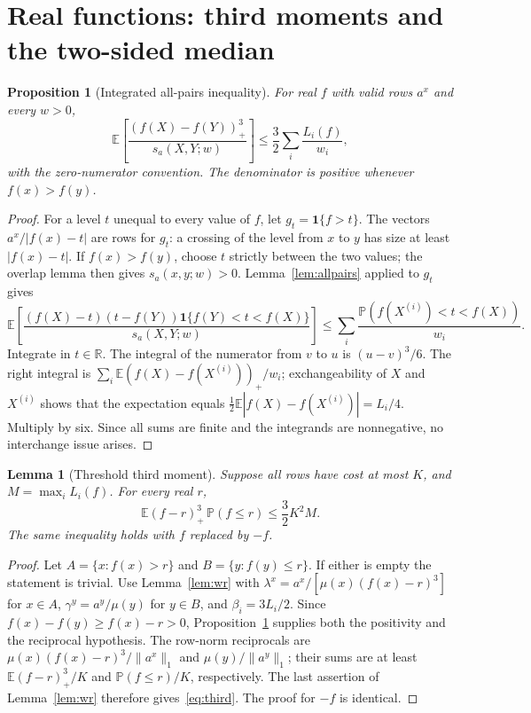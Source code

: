 \documentclass[11pt]{article}
\numberwithin{equation}{section}
\newtheorem{lemma}[theorem]{Lemma}
\newtheorem{proposition}[theorem]{Proposition}
\theoremstyle{remark}
\newcommand{\E}{\mathbb E}
\newcommand{\Prb}{\mathbb P}
\newcommand{\one}{\mathbf 1}
\newcommand{\R}{\mathbb R}
\newcommand{\norm}[1]{\lVert #1\rVert}
\newcommand{\pos}[1]{(#1)_{+}}
\begin{document}
\section{Real functions: third moments and the two-sided median}\label{sec:moments}
\begin{proposition}[Integrated all-pairs inequality]\label{prop:int}
For real $f$ with valid rows $a^x$ and every $w>0$,
\begin{equation}\label{eq:integrated}
 \E\left[\frac{\pos{f(X)-f(Y)}^3}{s_a(X,Y;w)}\right]
 \le\frac32\sum_i\frac{L_i(f)}{w_i},
\end{equation}
with the zero-numerator convention. The denominator is positive whenever $f(x)>f(y)$.
\end{proposition}
\begin{proof}
For a level $t$ unequal to every value of $f$, let $g_t=\one\{f>t\}$. The vectors $a^x/|f(x)-t|$ are rows for $g_t$: a crossing of the level from $x$ to $y$ has size at least $|f(x)-t|$. If $f(x)>f(y)$, choose $t$ strictly between the two values; the overlap lemma then gives $s_a(x,y;w)>0$. Lemma~\ref{lem:allpairs} applied to $g_t$ gives
\[
 \E\left[\frac{(f(X)-t)(t-f(Y))\one\{f(Y)<t<f(X)\}}
 {s_a(X,Y;w)}\right]
 \le\sum_i\frac{\Prb(f(X^{(i)})<t<f(X))}{w_i}.
\]
Integrate in $t\in\R$. The integral of the numerator from $v$ to $u$ is $(u-v)^3/6$. The right integral is
$\sum_i\E\pos{f(X)-f(X^{(i)})}/w_i$; exchangeability of $X$ and $X^{(i)}$ shows that the expectation equals $\frac12\E|f(X)-f(X^{(i)})|=L_i/4$. Multiply by six. Since all sums are finite and the integrands are nonnegative, no interchange issue arises.
\end{proof}

\begin{lemma}[Threshold third moment]\label{lem:third}
Suppose all rows have cost at most $K$, and $M=\max_iL_i(f)$. For every real $r$,
\begin{equation}\label{eq:third}
 \E\pos{f-r}^3\,\Prb(f\le r)\le\frac32K^2M.
\end{equation}
The same inequality holds with $f$ replaced by $-f$.
\end{lemma}
\begin{proof}
Let $A=\{x:f(x)>r\}$ and $B=\{y:f(y)\le r\}$. If either is empty the statement is trivial. Use Lemma~\ref{lem:wr} with
$\lambda^x=a^x/[\mu(x)(f(x)-r)^3]$ for $x\in A$,
$\gamma^y=a^y/\mu(y)$ for $y\in B$, and $\beta_i=3L_i/2$. Since $f(x)-f(y)\ge f(x)-r>0$, Proposition~\ref{prop:int} supplies both the positivity and the reciprocal hypothesis. The row-norm reciprocals are $\mu(x)(f(x)-r)^3/\norm{a^x}_1$ and $\mu(y)/\norm{a^y}_1$; their sums are at least $\E\pos{f-r}^3/K$ and $\Prb(f\le r)/K$, respectively. The last assertion of Lemma~\ref{lem:wr} therefore gives~\eqref{eq:third}. The proof for $-f$ is identical.
\end{proof}
\end{document}
